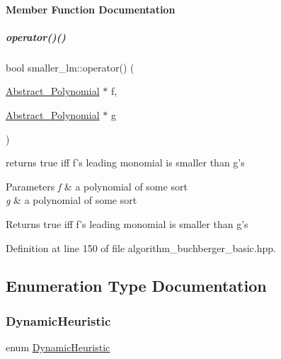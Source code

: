 \paragraph{Member Function Documentation}
\mbox{\label{group___g_b_computation_a683ffd0302d029cd21c5bafdf4335785}} 
\subparagraph{\texorpdfstring{operator()()}{operator()()}}
{\footnotesize\ttfamily bool smaller\+\_\+lm\+::operator() (\begin{DoxyParamCaption}\item[{\hyperlink{group__polygroup_class_abstract___polynomial}{Abstract\+\_\+\+Polynomial} $\ast$}]{f,  }\item[{\hyperlink{group__polygroup_class_abstract___polynomial}{Abstract\+\_\+\+Polynomial} $\ast$}]{g }\end{DoxyParamCaption})\hspace{0.3cm}{\ttfamily [inline]}}



returns {\ttfamily true} iff {\ttfamily f's} leading monomial is smaller than {\ttfamily g's} 


\begin{DoxyParams}{Parameters}
{\em f} & a polynomial of some sort \\
\hline
{\em g} & a polynomial of some sort \\
\hline
\end{DoxyParams}
\begin{DoxyReturn}{Returns}
{\ttfamily true} iff {\ttfamily f's} leading monomial is smaller than {\ttfamily g's} 
\end{DoxyReturn}


Definition at line 150 of file algorithm\+\_\+buchberger\+\_\+basic.\+hpp.



\subsection{Enumeration Type Documentation}
\mbox{\label{group___g_b_computation_ga498e6d10e581ed9dca25264cbe825ce0}} 
\subsubsection{\texorpdfstring{Dynamic\+Heuristic}{DynamicHeuristic}}
{\footnotesize\ttfamily enum \hyperlink{group___g_b_computation_ga498e6d10e581ed9dca25264cbe825ce0}{Dynamic\+Heuristic}\hspace{0.3cm}{\ttfamily [strong]}}

